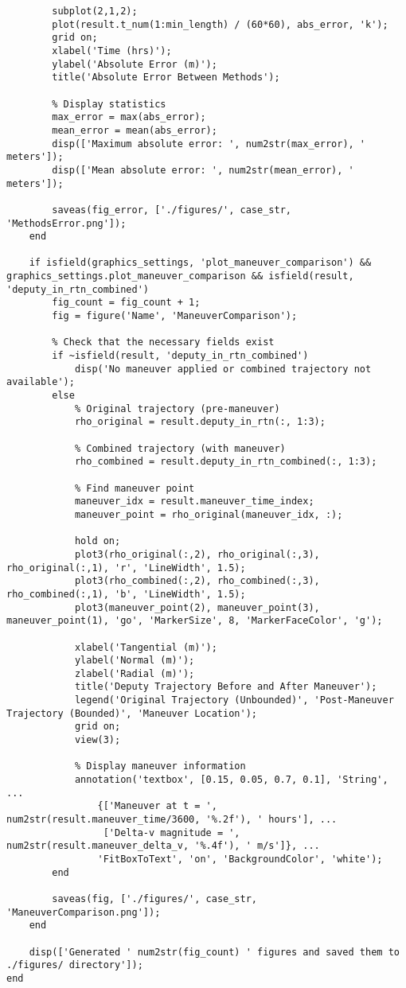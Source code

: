\begin{lstlisting}
        subplot(2,1,2);
        plot(result.t_num(1:min_length) / (60*60), abs_error, 'k');
        grid on;
        xlabel('Time (hrs)');
        ylabel('Absolute Error (m)');
        title('Absolute Error Between Methods');
        
        % Display statistics
        max_error = max(abs_error);
        mean_error = mean(abs_error);
        disp(['Maximum absolute error: ', num2str(max_error), ' meters']);
        disp(['Mean absolute error: ', num2str(mean_error), ' meters']);
        
        saveas(fig_error, ['./figures/', case_str, 'MethodsError.png']);
    end
    
    if isfield(graphics_settings, 'plot_maneuver_comparison') && graphics_settings.plot_maneuver_comparison && isfield(result, 'deputy_in_rtn_combined')
        fig_count = fig_count + 1;
        fig = figure('Name', 'ManeuverComparison');
        
        % Check that the necessary fields exist
        if ~isfield(result, 'deputy_in_rtn_combined')
            disp('No maneuver applied or combined trajectory not available');
        else
            % Original trajectory (pre-maneuver)
            rho_original = result.deputy_in_rtn(:, 1:3);
            
            % Combined trajectory (with maneuver)
            rho_combined = result.deputy_in_rtn_combined(:, 1:3);
            
            % Find maneuver point
            maneuver_idx = result.maneuver_time_index;
            maneuver_point = rho_original(maneuver_idx, :);
            
            hold on;
            plot3(rho_original(:,2), rho_original(:,3), rho_original(:,1), 'r', 'LineWidth', 1.5);
            plot3(rho_combined(:,2), rho_combined(:,3), rho_combined(:,1), 'b', 'LineWidth', 1.5);
            plot3(maneuver_point(2), maneuver_point(3), maneuver_point(1), 'go', 'MarkerSize', 8, 'MarkerFaceColor', 'g');
            
            xlabel('Tangential (m)');
            ylabel('Normal (m)');
            zlabel('Radial (m)');
            title('Deputy Trajectory Before and After Maneuver');
            legend('Original Trajectory (Unbounded)', 'Post-Maneuver Trajectory (Bounded)', 'Maneuver Location');
            grid on;
            view(3);
            
            % Display maneuver information
            annotation('textbox', [0.15, 0.05, 0.7, 0.1], 'String', ...
                {['Maneuver at t = ', num2str(result.maneuver_time/3600, '%.2f'), ' hours'], ...
                 ['Delta-v magnitude = ', num2str(result.maneuver_delta_v, '%.4f'), ' m/s']}, ...
                'FitBoxToText', 'on', 'BackgroundColor', 'white');
        end
        
        saveas(fig, ['./figures/', case_str, 'ManeuverComparison.png']);
    end
    
    disp(['Generated ' num2str(fig_count) ' figures and saved them to ./figures/ directory']);
end
\end{lstlisting}